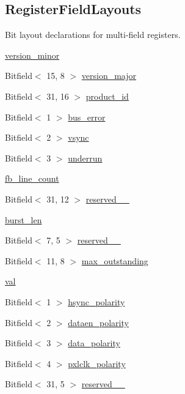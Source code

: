 \subsection*{RegisterFieldLayouts}
\label{_amgrp9ce006e68f89a3acc0c2edded41390ec}
 Bit layout declarations for multi-\/field registers. \begin{DoxyCompactItemize}
\item 
\hyperlink{classHDLcd_a4f40fa952becdbdacf7434cd3c404b7d}{version\_\-minor}
\item 
Bitfield$<$ 15, 8 $>$ \hyperlink{classHDLcd_a74571fc488367403e0193898d0a5367e}{version\_\-major}
\item 
Bitfield$<$ 31, 16 $>$ \hyperlink{classHDLcd_ac95f3b4958485c9925b2cb7f0302921f}{product\_\-id}
\item 
Bitfield$<$ 1 $>$ \hyperlink{classHDLcd_ad92f2664318eb7510c5ef4ed537fff93}{bus\_\-error}
\item 
Bitfield$<$ 2 $>$ \hyperlink{classHDLcd_aacc2f986e357e2a77bd80683f3c976aa}{vsync}
\item 
Bitfield$<$ 3 $>$ \hyperlink{classHDLcd_a7db18d8a83ae23e4d06cf8d21379b664}{underrun}
\item 
\hyperlink{classHDLcd_adeb07f49b4b2b8898397dbec03f22bb3}{fb\_\-line\_\-count}
\item 
Bitfield$<$ 31, 12 $>$ \hyperlink{classHDLcd_a582dec2bf3d914fb5d2ddb8feaa38111}{reserved\_\_}
\item 
\hyperlink{classHDLcd_a74212c0c2707c7e25bad89d6ac3004c9}{burst\_\-len}
\item 
Bitfield$<$ 7, 5 $>$ \hyperlink{classHDLcd_ada612a1f3eac7720c95c8b754b004b62}{reserved\_\_}
\item 
Bitfield$<$ 11, 8 $>$ \hyperlink{classHDLcd_a5f39b2e7351f4500ef1eb5babcb10381}{max\_\-outstanding}
\item 
\hyperlink{classHDLcd_acb906433e1289aa1c251dc5057746a88}{val}
\item 
Bitfield$<$ 1 $>$ \hyperlink{classHDLcd_ae1b5cd178099ce9f30eafb12ccf1bde8}{hsync\_\-polarity}
\item 
Bitfield$<$ 2 $>$ \hyperlink{classHDLcd_a2e88cca6e78a84d49d34de5407d3d048}{dataen\_\-polarity}
\item 
Bitfield$<$ 3 $>$ \hyperlink{classHDLcd_a82bbce2c586afda0822949bce915be7c}{data\_\-polarity}
\item 
Bitfield$<$ 4 $>$ \hyperlink{classHDLcd_a4fa9bf08d013c014d2e73e86607b4bed}{pxlclk\_\-polarity}
\item 
Bitfield$<$ 31, 5 $>$ \hyperlink{classHDLcd_a1ac4b70cb79ab9e24b9a264c8b8be6e4}{reserved\_\_}

\end{DoxyCompactItemize}
